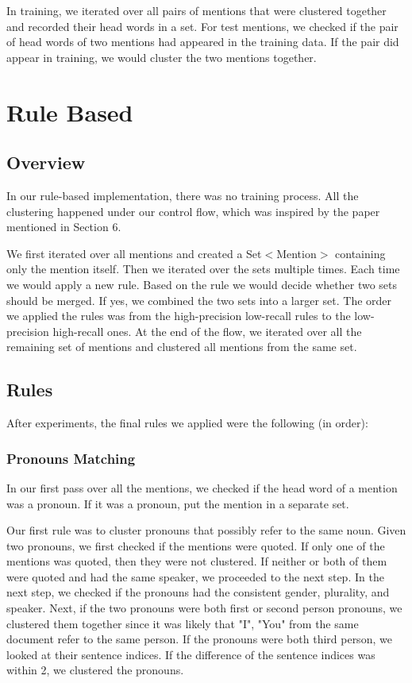 \documentclass[12pt, twocolumn]{article}
\begin{document}
In training, we iterated over all pairs of mentions that were clustered together and recorded their head words in a set. 
For test mentions, we checked if the pair of head words of two mentions had appeared in the training data. If the pair did appear in training, we would cluster the two mentions together.

\section{Rule Based}
\subsection{Overview}
In our rule-based implementation, there was no training process. All the clustering happened under our control flow, which was inspired by the paper mentioned in Section 6.

We first iterated over all mentions and created a Set$<$Mention$>$ containing only the mention itself. Then we iterated over the sets multiple times. Each time we would apply a new rule. Based on the rule we would decide whether two sets should be merged. If yes, we combined the two sets into a larger set. The order we applied the rules was from the high-precision low-recall rules to the low-precision high-recall ones. 
At the end of the flow, we iterated over all the remaining set of mentions and clustered all mentions from the same set.

\subsection{Rules}
After experiments, the final rules we applied were the following (in order):

\subsubsection{Pronouns Matching}
In our first pass over all the mentions, we checked if the head word of a mention was a pronoun. If it was a pronoun, put the mention in a separate set.

Our first rule was to cluster pronouns that possibly refer to the same noun. Given two pronouns, we first checked if the mentions were quoted. If only one of the mentions was quoted, then they were not clustered. If neither or both of them were quoted and had the same speaker, we proceeded to the next step. In the next step, we checked if the pronouns had the consistent gender, plurality, and speaker. Next, if the two pronouns were both first or second person pronouns, we clustered them together since it was likely that "I", "You" from the same document refer to the same person. If the pronouns were both third person, we looked at their sentence indices. If the difference of the sentence indices was within 2, we clustered the pronouns.
\end{document}
